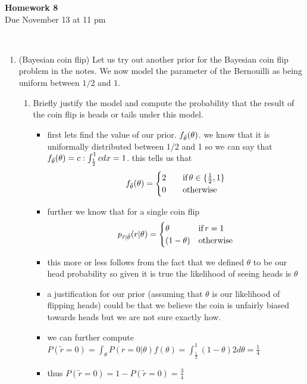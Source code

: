 \documentclass[12pt,twoside]{article}
\begin{document}
\begin{center}
{\large{\textbf{Homework 8}} } \\%
Due November 13 at 11 pm
\\
\end{center}
\\

\begin{enumerate}

\item (Bayesian coin flip)
Let us try out another prior for the Bayesian coin flip problem in the notes. We now model the parameter of the Bernouilli as being uniform between $1/2$ and $1$.
\begin{enumerate}
\item Briefly justify the model and compute the probability that the result of the coin flip is heads or tails under this model. 
\begin{itemize}
    \item first lets find the value of our prior. $f_{\Tilde{\theta}}(\theta)$. we know that it is uniformally distributed between 1/2 and 1 so we can say that $f_{\Tilde{\theta}}(\theta)=c:\int_{\frac{1}{2}}^{1}cdx=1$. this tells us that         \begin{equation*}
f_{ \Tilde{\theta}}(\theta)=\begin{cases}
        2 \quad &\text{if} \,  \theta \in\{\frac{1}{2},1\} \\
         0 &  \text{otherwise}   \\
     \end{cases}
\end{equation*}
\item further we know that for a single coin flip \begin{equation*}
p_{\Tilde{r}|\Tilde{\theta}}(r|\theta)=\begin{cases}
        \theta \quad &\text{if} \,  r =1 \\
         (1-\theta) &  \text{otherwise}   \\
     \end{cases}
\end{equation*}
\item this more or less follows from the fact that we defined $\theta$ to be our head probability so given it is true the likelihood of seeing heads is $\theta$
\item a justification for our prior (assuming that $\theta$ is our likelihood of flipping heads) could be that we believe the coin is unfairly biased towards heads but we are not sure exactly how.
\item we can further compute $P(\tilde{r}=0)=\int_{\theta}P(r=0|\theta)f(\theta)=\int_{\frac{1}{2}}^{1}(1-\theta)2d\theta=\frac{1}{4}$
\item thus $P(\tilde{r}=0)=1-P(\tilde{r}=0)=\frac{3}{4}$


\end{itemize}
\end{enumerate}
\end{enumerate}
\end{document}
